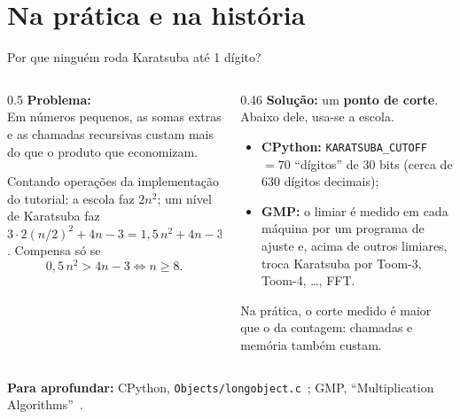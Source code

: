\documentclass[aspectratio=169,xcolor=table]{beamer}
\newcommand{\fonte}[1]{%
  \vfill
  {\tiny\color{gray!55!black}\textbf{Para aprofundar:} #1\par}%
}
\begin{document}
\section{Na prática e na história}

\begin{frame}{Por que ninguém roda Karatsuba até 1 dígito?}
  \begin{columns}[T]
    \begin{column}{0.5\textwidth}
      \textbf{Problema:}\\
      \scriptsize Em números pequenos, as somas extras e as chamadas recursivas custam mais
      do que o produto que economizam.
      \medskip

      Contando operações da implementação do tutorial: a escola faz $2n^2$; um nível de
      Karatsuba faz $3\cdot 2(n/2)^2 + 4n - 3 = 1{,}5\,n^2 + 4n - 3$. Compensa só se
      \[ 0{,}5\,n^2 > 4n - 3 \iff n \ge 8. \]
    \end{column}
    \begin{column}{0.46\textwidth}
      \textbf{Solução:} um \textbf{ponto de corte}.\\
      \scriptsize Abaixo dele, usa-se a escola.
      \begin{itemize}\scriptsize
        \item \textbf{CPython:} \texttt{KARATSUBA\_CUTOFF} $=70$ ``dígitos'' de 30 bits
              (cerca de 630 dígitos decimais);
        \item \textbf{GMP:} o limiar é medido em cada máquina por um programa de
              ajuste e, acima de outros limiares, troca Karatsuba por Toom-3, Toom-4, \ldots, FFT.
      \end{itemize}
      Na prática, o corte medido é maior que o da contagem: chamadas e memória também custam.
    \end{column}
  \end{columns}
  \fonte{CPython, \texttt{Objects/longobject.c}~\cite{cpython2026longobject};
    GMP, ``Multiplication Algorithms''~\cite{gmp2023manual}.}
\end{frame}
\end{document}
